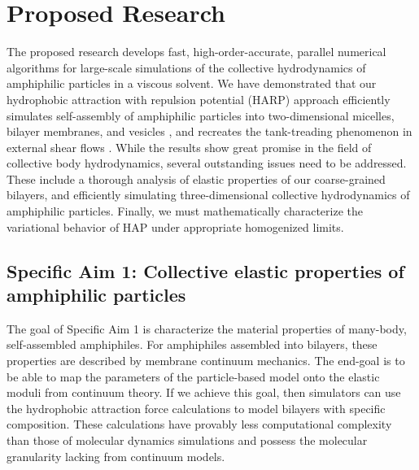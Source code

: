 \section{Proposed Research}
\label{sec:proposed-work}
The proposed research develops fast,
high-order-accurate, parallel numerical algorithms for large-scale
simulations of the collective hydrodynamics of amphiphilic particles in a viscous solvent.
%
We have demonstrated that our hydrophobic attraction with repulsion potential (HARP) approach efficiently simulates
self-assembly of amphiphilic particles into two-dimensional micelles, bilayer membranes, and vesicles \cite{Fu19}, and
recreates the tank-treading phenomenon in external shear flows \cite{Fu20}.
%
While the results show great promise in the field of collective body hydrodynamics,
several outstanding issues need to be addressed. These include a thorough 
analysis of elastic properties of our coarse-grained bilayers, and 
efficiently simulating three-dimensional collective hydrodynamics of amphiphilic particles.
Finally, we must mathematically characterize the variational behavior of HAP under appropriate homogenized limits.

\subsection{Specific Aim 1: Collective elastic properties of amphiphilic particles}
\label{subsec:specific_aim_1}

The goal of Specific Aim 1 is characterize the material properties of many-body, self-assembled amphiphiles.
For amphiphiles assembled into bilayers, these properties are described by membrane continuum mechanics.
The end-goal is to be able to map the parameters of the particle-based model onto the elastic moduli from continuum theory.
If we achieve this goal, then simulators can use the hydrophobic attraction force calculations
to model bilayers with specific composition. These calculations have provably less computational complexity than
those of molecular dynamics simulations and possess the molecular granularity lacking from continuum models.

